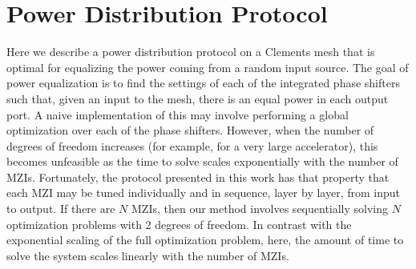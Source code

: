 \documentclass[%
 reprint,
 amsmath,amssymb,
 aps,
prstab,
floatfix,
]{revtex4-1}
\begin{document}
\section{\label{sec:algo}Power Distribution Protocol}

Here we describe a power distribution protocol on a Clements mesh that is optimal for equalizing the power coming from a random input source.  The goal of power equalization is to find the settings of each of the integrated phase shifters such that, given an input to the mesh, there is an equal power in each output port.  A naive implementation of this may involve performing a global optimization over each of the phase shifters.  However, when the number of degrees of freedom increases (for example, for a very large accelerator), this becomes unfeasible as the time to solve scales exponentially with the number of MZIs. Fortunately, the protocol presented in this work has that property that each MZI may be tuned individually and in sequence, layer by layer, from input to output. If there are $N$ MZIs, then our method involves sequentially solving $N$ optimization problems with 2 degrees of freedom.  In contrast with the exponential scaling of the full optimization problem, here, the amount of time to solve the system scales linearly with the number of MZIs.
\end{document}
